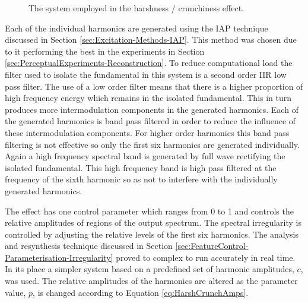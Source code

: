 \begin{figure}[h!]
				\caption{The system employed in the harshness / crunchiness effect.}
				\label{fig:HarshCrunch}
			\end{figure}

			Each of the individual harmonics are generated using the IAP technique discussed in Section
			\ref{sec:Excitation-Methods-IAP}. This method was chosen due to it performing the best in the
			experiments in Section \ref{sec:PerceptualExperiments-Reconstruction}. To reduce computational load
			the filter used to isolate the fundamental in this system is a second order IIR low pass filter.
			The use of a low order filter means that there is a higher proportion of high frequency energy
			which remains in the isolated fundamental. This in turn produces more intermodulation components in
			the generated harmonics. Each of the generated harmonics is band pass filtered in order to reduce
			the influence of these intermodulation components. For higher order harmonics this band pass
			filtering is not effective so only the first six harmonics are generated individually. Again a high
			frequency spectral band is generated by full wave rectifying the isolated fundamental. This high
			frequency band is high pass filtered at the frequency of the sixth harmonic so as not to interfere
			with the individually generated harmonics.

			The effect has one control parameter which ranges from 0 to 1 and controls the relative amplitudes
			of regions of the output spectrum. The spectral irregularity is controlled by adjusting the
			relative levels of the first six harmonics. The analysis and resynthesis technique discussed in
			Section \ref{sec:FeatureControl-Parameterisation-Irregularity} proved to complex to run accurately
			in real time. In its place a simpler system based on a predefined set of harmonic amplitudes,
			$c$, was used. The relative amplitudes of the harmonics are altered as the parameter value, $p$,
			is changed according to Equation \ref{eq:HarshCrunchAmps}.

